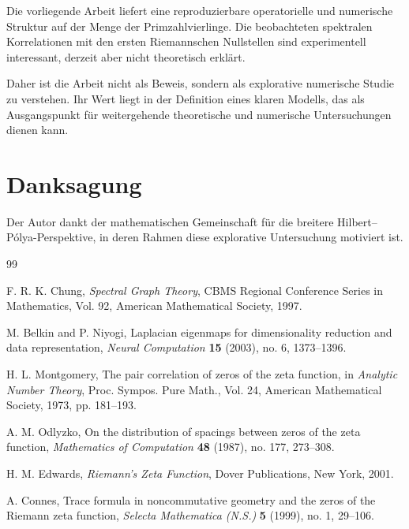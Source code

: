 \documentclass[11pt,a4paper,draft]{article}
\begin{document}
	Die vorliegende Arbeit liefert eine reproduzierbare operatorielle und numerische Struktur auf der Menge der Primzahlvierlinge. Die beobachteten spektralen Korrelationen mit den ersten Riemannschen Nullstellen sind experimentell interessant, derzeit aber nicht theoretisch erklärt.
	
	Daher ist die Arbeit nicht als Beweis, sondern als explorative numerische Studie zu verstehen. Ihr Wert liegt in der Definition eines klaren Modells, das als Ausgangspunkt für weitergehende theoretische und numerische Untersuchungen dienen kann.
	
	\section*{Danksagung}
	
	Der Autor dankt der mathematischen Gemeinschaft für die breitere Hilbert--Pólya-Perspektive, in deren Rahmen diese explorative Untersuchung motiviert ist.
	
	\begin{thebibliography}{99}
		
		F. R. K. Chung,
		\emph{Spectral Graph Theory},
		CBMS Regional Conference Series in Mathematics, Vol. 92,
		American Mathematical Society, 1997.
		
		M. Belkin and P. Niyogi,
		Laplacian eigenmaps for dimensionality reduction and data representation,
		\emph{Neural Computation} \textbf{15} (2003), no. 6, 1373--1396.
		
		H. L. Montgomery,
		The pair correlation of zeros of the zeta function,
		in \emph{Analytic Number Theory},
		Proc. Sympos. Pure Math., Vol. 24,
		American Mathematical Society, 1973, pp. 181--193.
		
		A. M. Odlyzko,
		On the distribution of spacings between zeros of the zeta function,
		\emph{Mathematics of Computation} \textbf{48} (1987), no. 177, 273--308.
		
		H. M. Edwards,
		\emph{Riemann's Zeta Function},
		Dover Publications, New York, 2001.
		
		A. Connes,
		Trace formula in noncommutative geometry and the zeros of the Riemann zeta function,
		\emph{Selecta Mathematica (N.S.)} \textbf{5} (1999), no. 1, 29--106.
		
	\end{thebibliography}
	
\end{document}
